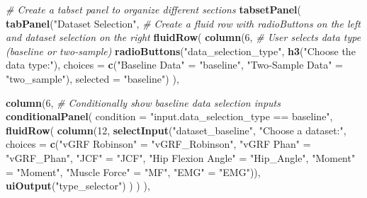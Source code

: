 \documentclass[
]{article}
\newenvironment{Shaded}{\begin{snugshade}}{\end{snugshade}}
\newcommand{\AttributeTok}[1]{\textcolor[rgb]{0.13,0.29,0.53}{#1}}
\newcommand{\CommentTok}[1]{\textcolor[rgb]{0.56,0.35,0.01}{\textit{#1}}}
\newcommand{\DecValTok}[1]{\textcolor[rgb]{0.00,0.00,0.81}{#1}}
\newcommand{\FunctionTok}[1]{\textcolor[rgb]{0.13,0.29,0.53}{\textbf{#1}}}
\newcommand{\NormalTok}[1]{#1}
\newcommand{\OtherTok}[1]{\textcolor[rgb]{0.56,0.35,0.01}{#1}}
\newcommand{\StringTok}[1]{\textcolor[rgb]{0.31,0.60,0.02}{#1}}
\begin{document}
\begin{Shaded}
\begin{Highlighting}[]
  \CommentTok{\# Create a tabset panel to organize different sections}
  \FunctionTok{tabsetPanel}\NormalTok{(}
    \FunctionTok{tabPanel}\NormalTok{(}\StringTok{"Dataset Selection"}\NormalTok{,}
             \CommentTok{\# Create a fluid row with radioButtons on the left and dataset selection on the right}
             \FunctionTok{fluidRow}\NormalTok{(}
               \FunctionTok{column}\NormalTok{(}\DecValTok{6}\NormalTok{,}
                      \CommentTok{\# User selects data type (baseline or two{-}sample)}
                      \FunctionTok{radioButtons}\NormalTok{(}\StringTok{"data\_selection\_type"}\NormalTok{, }\FunctionTok{h3}\NormalTok{(}\StringTok{"Choose the data type:"}\NormalTok{),}
                                   \AttributeTok{choices =} \FunctionTok{c}\NormalTok{(}\StringTok{"Baseline Data"} \OtherTok{=} \StringTok{"baseline"}\NormalTok{, }
                                               \StringTok{"Two{-}Sample Data"} \OtherTok{=} \StringTok{"two\_sample"}\NormalTok{),}
                                   \AttributeTok{selected =} \StringTok{"baseline"}\NormalTok{)}
\NormalTok{               ),}
               
               \FunctionTok{column}\NormalTok{(}\DecValTok{6}\NormalTok{,}
                      \CommentTok{\# Conditionally show baseline data selection inputs}
                      \FunctionTok{conditionalPanel}\NormalTok{(}
                        \AttributeTok{condition =} \StringTok{"input.data\_selection\_type == \textquotesingle{}baseline\textquotesingle{}"}\NormalTok{,}
                        \FunctionTok{fluidRow}\NormalTok{(}
                          \FunctionTok{column}\NormalTok{(}\DecValTok{12}\NormalTok{,}
                                 \FunctionTok{selectInput}\NormalTok{(}\StringTok{"dataset\_baseline"}\NormalTok{, }\StringTok{"Choose a dataset:"}\NormalTok{,}
                                             \AttributeTok{choices =} \FunctionTok{c}\NormalTok{(}\StringTok{"vGRF Robinson"} \OtherTok{=} \StringTok{"vGRF\_Robinson"}\NormalTok{,}
                                                         \StringTok{"vGRF Phan"} \OtherTok{=} \StringTok{"vGRF\_Phan"}\NormalTok{,}
                                                         \StringTok{"JCF"} \OtherTok{=} \StringTok{"JCF"}\NormalTok{,}
                                                         \StringTok{"Hip Flexion Angle"} \OtherTok{=} \StringTok{"Hip\_Angle"}\NormalTok{,}
                                                         \StringTok{"Moment"} \OtherTok{=} \StringTok{"Moment"}\NormalTok{,}
                                                         \StringTok{"Muscle Force"} \OtherTok{=} \StringTok{"MF"}\NormalTok{,}
                                                         \StringTok{"EMG"} \OtherTok{=} \StringTok{"EMG"}\NormalTok{)),}
                                 \FunctionTok{uiOutput}\NormalTok{(}\StringTok{"type\_selector"}\NormalTok{)}
\NormalTok{                          )}
\NormalTok{                        )}
\NormalTok{                      ),}
                      

\end{Highlighting}
\end{Shaded}
\end{document}
